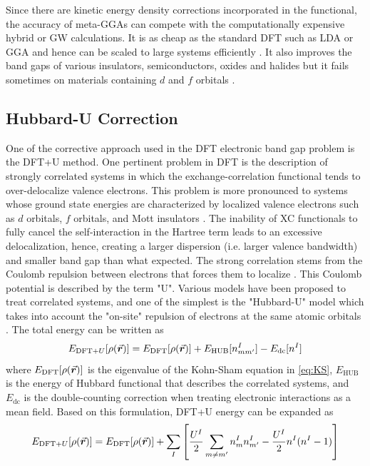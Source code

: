 Since there are kinetic energy density corrections incorporated in the functional, the accuracy of meta-GGAs can compete with the computationally expensive hybrid or GW calculations. It is as cheap as the standard DFT such as LDA or GGA and hence can be scaled to large systems efficiently \citep{Tran2009}. It also improves the band gaps of various insulators, semiconductors, oxides and halides but it fails sometimes on materials containing $d$ and $f$ orbitals \citep{Singh2010,Singh2010a}.


\subsection{Hubbard-U Correction}
One of the corrective approach used in the DFT electronic band gap problem is the DFT+U method. One pertinent problem in DFT is the description of strongly correlated systems in which the exchange-correlation functional tends to over-delocalize valence electrons. This problem is more pronounced to systems whose ground state energies are characterized by localized valence electrons such as $d$ orbitals, $f$ orbitals, and Mott insulators \citep{Himmetoglu2013}. The inability of XC functionals to fully cancel the self-interaction in the Hartree term leads to an excessive delocalization, hence, creating a larger dispersion (i.e. larger valence bandwidth) and smaller band gap than what expected. The strong correlation stems from the Coulomb repulsion between electrons that forces them to localize \citep{Shen1991}. This Coulomb potential is described by the term "U". Various models have been proposed to treat correlated systems, and one of the simplest is the "Hubbard-U" model which takes into account the "on-site" repulsion of electrons at the same atomic orbitals \citep{Tolba2018}. The total energy can be written as \citep{Liechtenstein1995,Dudarev1998,Cococcioni2005}
\begin{equation}
	E_{\text{DFT}+U} [\rho({\va*{r}})] = E_{\text{DFT}} [\rho({\va*{r}})] + E_{\text{HUB}}[{n^I_{mm'}}] - E_{\text{dc}} [n^I]
\end{equation}
where $E_{\text{DFT}} [\rho({\va*{r}})]$ is the eigenvalue of the Kohn-Sham equation in \eqref{eq:KS}, $E_{\text{HUB}}$ is the energy of Hubbard functional that describes the correlated systems, and $E_{\text{dc}}$ is the double-counting correction when treating electronic interactions as a mean field. Based on this formulation, DFT+U energy can be expanded as
\begin{equation}
	E_{\text{DFT}+U} [\rho({\va*{r}})] = E_{\text{DFT}} [\rho({\va*{r}})] + \sum_I \left[\frac{U^I}{2} \sum_{m \neq m'}  {n^I_{m}} {n^I_{m'}} - \frac{U^I}{2} n^I (n^I - 1)\right]
\end{equation}
